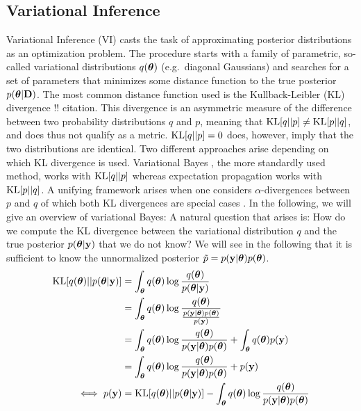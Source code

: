 \documentclass[../thesis.tex]{subfiles}
\begin{document}
\subsection{Variational Inference}
Variational Inference (VI) casts the task of approximating posterior distributions as an optimization problem. The procedure starts with a family of parametric, so-called variational distributions $q(\boldsymbol{\mathbf{\theta}})$ (e.g.\ diagonal Gaussians) and searches for a set of parameters that minimizes some distance function to the true posterior $p(\boldsymbol{\mathbf{\theta}}|\boldsymbol{\mathbf{D}})$. The most common distance function used is the Kullback-Leibler (KL) divergence !! citation. This divergence is an asymmetric measure of the difference between two probability distributions $q$ and $p$, meaning that $\operatorname{KL}[q||p]\neq \operatorname{KL}[p||q]$, and does thus not qualify as a metric. $\operatorname{KL}[q||p]=0$ does, however, imply that the two distributions are identical. Two different approaches arise depending on which KL divergence is used. Variational Bayes \parencite{attias1999inferring}, the more standardly used method, works with $\operatorname{KL}[q||p]$ whereas expectation propagation \parencite{minka2001expectation} works with $\operatorname{KL}[p||q]$. A unifying framework arises when one considers $\alpha$-divergences between $p$ and $q$ of which both KL divergences are special cases \parencite{hernandez2016black}. In the following, we will give an overview of variational Bayes:
A natural question that arises is: How do we compute the KL divergence between the variational distribution $q$ and the true posterior $p(\boldsymbol{\mathbf{\theta}} | \boldsymbol{\mathbf{y}})$ that we do not know? We will see in the following that it is sufficient to know the unnormalized posterior $\tilde{p} = p(\boldsymbol{\mathbf{y}} | \boldsymbol{\mathbf{\theta}}) p(\boldsymbol{\mathbf{\theta}})$.
\begin{align}
    \operatorname{KL}[q(\boldsymbol{\mathbf{\theta}})||p(\boldsymbol{\mathbf{\theta}} | \boldsymbol{\mathbf{y}})] &= \int_{\boldsymbol{\mathbf{\theta}}} q(\boldsymbol{\mathbf{\theta}}) \log \frac{q(\boldsymbol{\mathbf{\theta}})} {p(\boldsymbol{\mathbf{\theta}} | \boldsymbol{\mathbf{y}})} \\
    &= \int_{\boldsymbol{\mathbf{\theta}}} q(\boldsymbol{\mathbf{\theta}}) \log \frac{q(\boldsymbol{\mathbf{\theta}})}  {\frac{p(\boldsymbol{\mathbf{y}} | \boldsymbol{\mathbf{\theta}}) p(\boldsymbol{\mathbf{\theta}})} {p(\boldsymbol{\mathbf{y}})}} \\
    &= \int_{\boldsymbol{\mathbf{\theta}}} q(\boldsymbol{\mathbf{\theta}}) \log \frac{q(\boldsymbol{\mathbf{\theta}})}{p(\boldsymbol{\mathbf{y}} | \boldsymbol{\mathbf{\theta}}) p(\boldsymbol{\mathbf{\theta}})}  +  \int_{\boldsymbol{\mathbf{\theta}}} q(\boldsymbol{\mathbf{\theta}}) p(\boldsymbol{\mathbf{y}}) \\
    &= \int_{\boldsymbol{\mathbf{\theta}}} q(\boldsymbol{\mathbf{\theta}}) \log \frac{q(\boldsymbol{\mathbf{\theta}})}{p(\boldsymbol{\mathbf{y}} | \boldsymbol{\mathbf{\theta}}) p(\boldsymbol{\mathbf{\theta}})}  +   p(\boldsymbol{\mathbf{y}}) \\
\iff p(\boldsymbol{\mathbf{y}}) &= \operatorname{KL}[q(\boldsymbol{\mathbf{\theta}})||p(\boldsymbol{\mathbf{\theta}} | \boldsymbol{\mathbf{y}})]  -  \int_{\boldsymbol{\mathbf{\theta}}} q(\boldsymbol{\mathbf{\theta}}) \log \frac{q(\boldsymbol{\mathbf{\theta}})}{p(\boldsymbol{\mathbf{y}} | \boldsymbol{\mathbf{\theta}}) p(\boldsymbol{\mathbf{\theta}})}
\end{align}
\end{document}
